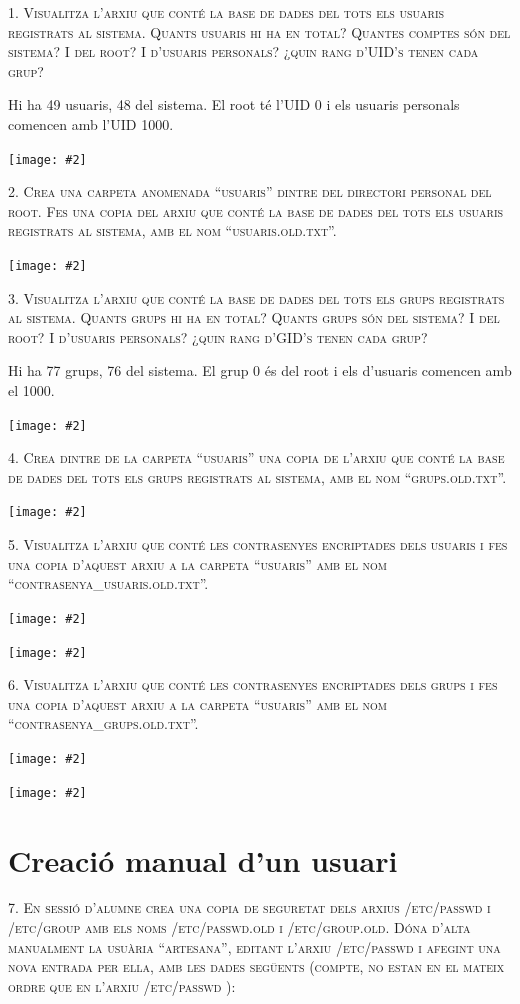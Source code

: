 \documentclass[a4paper,12pt]{article}
\newcommand{\mygraphic}[2][width=\textwidth]{\begin{center}
		\centering\texttt{[image: \#2]}\par
\end{center}}
\begin{document}


\tableofcontents

\newpage
\textsc{1. Visualitza l’arxiu que conté la base de dades del tots els usuaris registrats al sistema. Quants usuaris hi ha en total? Quantes comptes són del sistema? I del root? I d’usuaris personals? ¿quin rang d’UID’s tenen cada grup?}

Hi ha 49 usuaris, 48 del sistema. El root té l'UID 0 i els usuaris personals comencen amb l'UID 1000.
\mygraphic{imatges/1.png}

\newpage
\textsc{2. Crea una carpeta anomenada “usuaris” dintre del directori personal del root. Fes una copia del arxiu que conté la base de dades del tots els usuaris registrats al sistema, amb el nom “usuaris.old.txt”.}

\mygraphic{imatges/2.png}

\newpage
\textsc{3. Visualitza l’arxiu que conté la base de dades del tots els grups registrats al sistema. Quants grups hi ha en total? Quants grups són del sistema? I del root? I d’usuaris personals? ¿quin rang d’GID’s tenen cada grup?}

Hi ha 77 grups, 76 del sistema. El grup 0 és del root i els d'usuaris comencen amb el 1000.
\mygraphic{imatges/3.png}

\newpage
\textsc{4. Crea dintre de la carpeta “usuaris” una copia de l’arxiu que conté la base de dades del tots els grups registrats al sistema, amb el nom “grups.old.txt”.}
\mygraphic{imatges/4.png}

\newpage
\textsc{5. Visualitza l’arxiu que conté les contrasenyes encriptades dels usuaris i fes una copia d’aquest arxiu a la carpeta “usuaris” amb el nom “contrasenya\_usuaris.old.txt”.}
\mygraphic{imatges/5a.png}
\mygraphic{imatges/5b.png}

\newpage
\textsc{6. Visualitza l’arxiu que conté les contrasenyes encriptades dels grups i fes una copia d’aquest arxiu a la carpeta “usuaris” amb el nom “contrasenya\_grups.old.txt”.}
\mygraphic{imatges/6a.png}
\mygraphic{imatges/6b.png}

\newpage
\section{Creació manual d’un usuari}
\textsc{7. En sessió d’alumne crea una copia de seguretat dels arxius /etc/passwd i /etc/group amb els noms /etc/passwd.old i \linebreak /etc/group.old. Dóna d’alta manualment la usuària “artesana”, editant l’arxiu /etc/passwd i afegint una nova entrada per ella, amb les dades següents (compte, no estan en el mateix ordre que en l’arxiu /etc/passwd ):}
\end{document}
